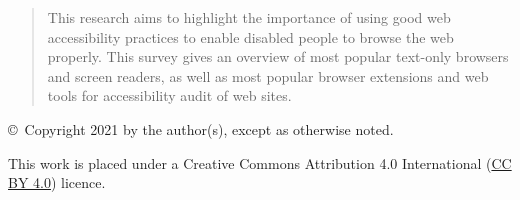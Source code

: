 \documentclass[11pt,onecolumn,twoside]{report}
\newcommand{\thisyear}{2021}         %
\renewcommand{\lstlistlistingname}{List of Listings}
\begin{document}
\begin{titlepage}
\begin{quote}
This research aims to highlight the importance of using good web accessibility practices to enable disabled people to browse the web properly. This survey gives an overview of most popular text-only browsers and screen readers, as well as most popular browser extensions and web tools for accessibility audit of web sites.
\end{quote}

\vfill

\begin{center}
{\footnotesize\sffamily \copyright~Copyright \thisyear{} by the author(s),
except as otherwise noted.}

\vspace{2mm}
{\footnotesize\sffamily This work is placed under a
Creative Commons Attribution 4.0 International
(\href{https://creativecommons.org/licenses/by/4.0/}{CC BY 4.0}) licence.}
\end{center}

\end{titlepage}




\cleardoublepage
\pagestyle{plain}             %


\begin{spacing}{0.8}
\tableofcontents
\end{spacing}

\cleardoublepage
\begin{spacing}{0.8}
\listoffigures
\end{spacing}

\cleardoublepage
\begin{spacing}{0.8}
\listoftables
\end{spacing}

\cleardoublepage
\begin{spacing}{0.8}
\renewcommand{\lstlistlistingname}{List of Listings}
\lstlistoflistings
\end{spacing}



\cleardoublepage
\pagestyle{main}              %


\cleardoublepage


\cleardoublepage


\cleardoublepage


\cleardoublepage


\cleardoublepage



\cleardoublepage
\begin{otherlanguage}{english}
\printbibliography[heading=bibintoc]
\end{otherlanguage}
\end{document}
